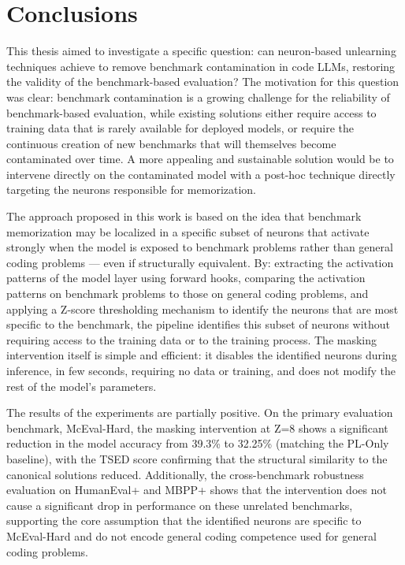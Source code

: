 \documentclass[mscthesis]{usiinfthesis}
\begin{document}
\chapter{Conclusions}
This thesis aimed to investigate a specific question: can neuron-based unlearning techniques achieve to remove benchmark contamination in code LLMs, restoring the validity of the benchmark-based evaluation?
The motivation for this question was clear: benchmark contamination is a growing challenge for the reliability of benchmark-based evaluation, while existing solutions either require access to training data that is rarely available for deployed models, or require the continuous creation of new benchmarks that will themselves become contaminated over time.
A more appealing and sustainable solution would be to intervene directly on the contaminated model with a post-hoc technique directly targeting the neurons responsible for memorization.
\par\vspace{1em}
The approach proposed in this work is based on the idea that benchmark memorization may be localized in a specific subset of neurons that activate strongly when the model is exposed to benchmark problems rather than general coding problems --- even if structurally equivalent.
By: extracting the activation patterns of the model layer using forward hooks, comparing the activation patterns on benchmark problems to those on general coding problems, and applying a Z-score thresholding mechanism to identify the neurons that are most specific to the benchmark, the pipeline identifies this subset of neurons without requiring access to the training data or to the training process.
The masking intervention itself is simple and efficient: it disables the identified neurons during inference, in few seconds, requiring no data or training, and does not modify the rest of the model's parameters.
\par\vspace{1em}
The results of the experiments are partially positive.
On the primary evaluation benchmark, McEval-Hard, the masking intervention at Z=8 shows a significant reduction in the model accuracy from 39.3\% to 32.25\% (matching the PL-Only baseline), with the TSED score confirming that the structural similarity to the canonical solutions reduced.
Additionally, the cross-benchmark robustness evaluation on HumanEval+ and MBPP+ shows that the intervention does not cause a significant drop in performance on these unrelated benchmarks, supporting the core assumption that the identified neurons are specific to McEval-Hard and do not encode general coding competence used for general coding problems.
\end{document}
